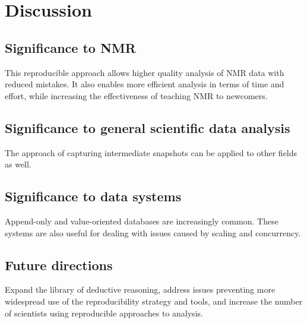 \chapter{Discussion}

\section{Significance to NMR}
This reproducible approach allows higher quality analysis of NMR data with
reduced mistakes.  It also enables more efficient analysis in terms of time
and effort, while increasing the effectiveness of teaching NMR to newcomers.



\section{Significance to general scientific data analysis}
The approach of capturing intermediate snapshots can be applied to other
fields as well.



\section{Significance to data systems}
Append-only and value-oriented databases are increasingly common.  These systems
are also useful for dealing with issues caused by scaling and concurrency.



\section{Future directions}
Expand the library of deductive reasoning, address issues preventing more
widespread use of the reproducibility strategy and tools, and increase the
number of scientists using reproducible approaches to analysis.

